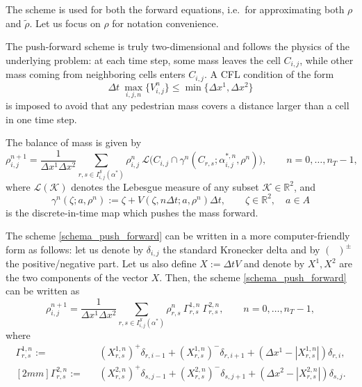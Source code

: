 \documentclass{cmslatex}
\newcommand{\R}{\mathbb{R}}
\newcommand{\alphastar}{\alpha^*}
\renewcommand{\r}{\rho}
\newcommand{\Dx}{\Delta x^1}
\newcommand{\Dy}{\Delta x^2}
\newcommand{\Dt}{\Delta t}
\begin{document}
The scheme is used for both the forward equations, i.e.\ for approximating both $\r$ and $\tilde\r$. Let us focus on $\r$ for notation convenience.

The push-forward scheme is truly two-dimensional and follows the physics of the underlying problem: at each time step, some mass leaves the cell $C_{i,j}$, while other mass coming from neighboring cells enters $C_{i,j}$. A CFL condition of the form
\begin{equation}\label{CFL}
\Dt \ \max_{i,j,n} \{V_{i,j}^n\}\leq \min\{\Dx,\Dy\} 
\end{equation}
is imposed to avoid that any pedestrian mass covers a distance larger than a cell in one time step.

The balance of mass is given by \cite[Sect.\ 5.5.2]{cristiani2014book}
\begin{equation}\label{schema_push_forward}
\r^{n+1}_{i,j} = \frac{1}{\Dx \Dy}
\sum\limits_{r,s\in I^\mathcal S_{i,j}(\alphastar)}%
\r^{n}_{i,j}\ \mathcal L\big(C_{i,j}\cap\gamma^n(C_{r,s};\alpha^{*,n}_{i,j},\rho^n)\big), \qquad n=0,\ldots,n_T-1,
\end{equation}
where $\mathcal L(\mathcal K)$ denotes the Lebesgue measure of any subset $\mathcal K\in\R^2$, 
and 
$$
\gamma^n(\zeta;a,\rho^n):=\zeta+V(\zeta,n\Dt;a,\rho^n)\Dt,\qquad \zeta\in\R^2,\quad a\in A
$$
is the discrete-in-time map which pushes the mass forward. 

The scheme \eqref{schema_push_forward} can be written in a more computer-friendly form as follows: 
let us denote by $\delta_{i,j}$ the standard Kronecker delta and by $(\phantom{x})^\pm$ the positive/negative part. Let us also define $X:=\Dt V$ and denote by $X^1, X^2$ are the two components of the vector $X$.
Then, the scheme \eqref{schema_push_forward} can be written as
\begin{equation}\label{schema_push_forward_implementato}
\r^{n+1}_{i,j} =\frac{1}{\Dx\Dy} \sum\limits_{r,s\in I^\mathcal S_{i,j}(\alphastar)} \r^{n}_{r,s} \ \Gamma_{r,s}^{1,n} \ \Gamma_{r,s}^{2,n},
\qquad n=0,\ldots,n_T-1, 
\end{equation}
%
where
%
\begin{eqnarray*}
\Gamma_{r,s}^{1,n} := & & 
\left(X_{r,s}^{1,n}\right)^+ \delta_{r,i-1} + 
\left(X_{r,s}^{1,n}\right)^- \delta_{r,i+1} + 
\left(\Dx-|X_{r,s}^{1,n}|\right)\delta_{r,i}, \\ [2mm]
%
\Gamma_{r,s}^{2,n} := & &
\left(X_{r,s}^{2,n}\right)^+ \delta_{s,j-1} + 
\left(X_{r,s}^{2,n}\right)^- \delta_{s,j+1} + 
\left(\Dy-|X_{r,s}^{2,n}|\right)\delta_{s,j}.
\end{eqnarray*}
%
\end{document}
